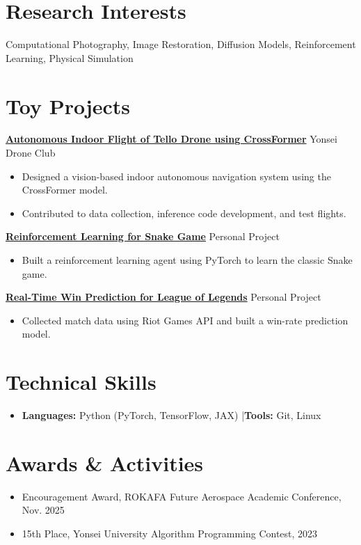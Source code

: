 \documentclass[a4paper,10pt]{article}
\begin{document}
\section*{Research Interests}
Computational Photography, Image Restoration, Diffusion Models, Reinforcement Learning, Physical Simulation

\section*{Toy Projects}
\textbf{\href{https://www.youtube.com/watch?v=gmeZ6BD5u0w}{Autonomous Indoor Flight of Tello Drone using CrossFormer}} \hfill Yonsei Drone Club
\begin{itemize}
  \item Designed a vision-based indoor autonomous navigation system using the CrossFormer model.
  \item Contributed to data collection, inference code development, and test flights.
\end{itemize}

\smallskip

\textbf{\href{https://github.com/abcdvd/snake-game-reinforcement-learning}{Reinforcement Learning for Snake Game}} \hfill Personal Project
\begin{itemize}
  \item Built a reinforcement learning agent using PyTorch to learn the classic Snake game.
\end{itemize}

\smallskip

\textbf{\href{https://github.com/abcdvd/league-of-legends-winner-predicting}{Real-Time Win Prediction for League of Legends}} \hfill Personal Project
\begin{itemize}
  \item Collected match data using Riot Games API and built a win-rate prediction model.
\end{itemize}

\section*{Technical Skills}
\begin{itemize}
  \item \textbf{Languages:} Python (PyTorch, TensorFlow, JAX) \quad|\quad \textbf{Tools:} Git, Linux
\end{itemize}

\section*{Awards \& Activities}
\begin{itemize}
  \item Encouragement Award, ROKAFA Future Aerospace Academic Conference, Nov. 2025
  \item 15th Place, Yonsei University Algorithm Programming Contest, 2023
\end{itemize}
\end{document}
